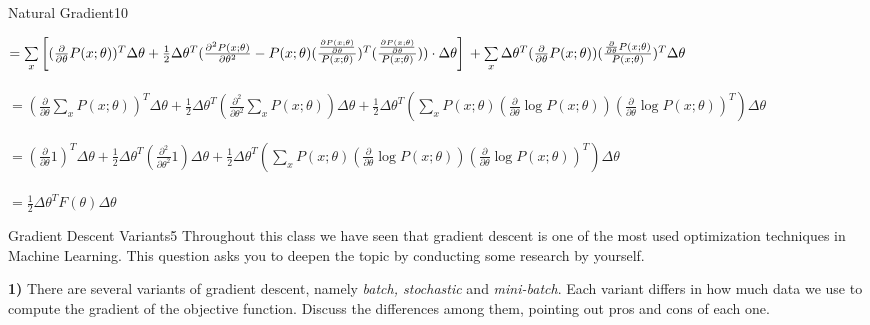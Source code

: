 \begin{questions}
\begin{question}[bonus]{Natural Gradient}{10}
\begin{answer}
$ = \sum \limits_{x} \left[ (\frac{\partial}{\partial \theta} P(x;\theta))^{T}\Delta \theta + \frac{1}{2}\Delta \theta^{T}(
 \frac{\partial^{2} P(x;\theta)}{\partial \theta^{2}} -P(x;\theta)(\frac{\frac{\partial P(x;\theta)}{\partial \theta}}{P(x;\theta)})^{T}(\frac{\frac{\partial P(x;\theta)}{\partial \theta}}{P(x;\theta)})) \cdot \Delta \theta \right ]  \\ \\
+ \sum \limits_{x}\Delta \theta^{T} (\frac{\partial}{\partial \theta} P(x;\theta)) (\frac{\frac{\partial}{\partial \theta} P(x;\theta)}{P(x;\theta)})^{T} \Delta \theta $ \\ \\

$ = (\frac{\partial}{\partial \theta} \sum \limits_{x}P(x;\theta))^{T} \Delta \theta + \frac{1}{2} \Delta \theta^{T} (\frac{\partial^{2}}{\partial \theta^{2}}\sum \limits_{x}P(x;\theta)) \Delta \theta + 
\frac{1}{2} \Delta \theta^{T} (\sum \limits_{x} P(x;\theta) (\frac{\partial}{\partial \theta} \log P(x;\theta))(\frac{\partial}{\partial \theta} \log P(x;\theta))^{T})\Delta \theta $ \\ \\ 
$ = (\frac{\partial}{\partial \theta} 1)^{T} \Delta \theta + \frac{1}{2} \Delta \theta^{T} (\frac{\partial^{2}}{\partial \theta^{2}}1) \Delta \theta + 
\frac{1}{2} \Delta \theta^{T} (\sum \limits_{x} P(x;\theta) (\frac{\partial}{\partial \theta} \log P(x;\theta))(\frac{\partial}{\partial \theta} \log P(x;\theta))^{T})\Delta \theta $ \\ \\ 
$ = \frac{1}{2} \Delta \theta^{T}F(\theta)\Delta \theta $
\end{answer}

\end{question}


\begin{question}[bonus]{Gradient Descent Variants}{5}
Throughout this class we have seen that gradient descent is one of the most used optimization techniques in Machine Learning. This question asks you to deepen the topic by conducting some research by yourself.

\textbf{1)} There are several variants of gradient descent, namely \emph{batch, stochastic} and \emph{mini-batch}. Each variant differs in how much data we use to compute the gradient of the objective function. 
Discuss the differences among them, pointing out pros and cons of each one.


\end{question}
\end{questions}
